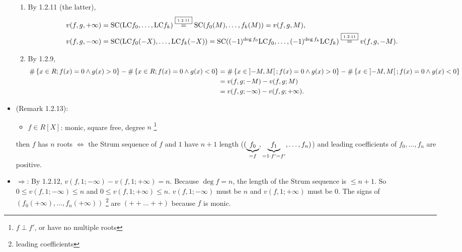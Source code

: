 \documentclass[9pt]{ltjsarticle}
\begin{document}
\begin{itemize}
\begin{enumerate}
    \item
    By 1.2.11 (the latter),
    \begin{align}
      v(f,g,+\infty) &= \mathrm{SC}({\rm LC} f_0,\dots,{\rm LC} f_k)
      \overset{\text{\fbox{\tiny 1.2.11}}}{=}
      \mathrm{SC}(f_0(M),\dots,f_k(M))
      =
      v(f,g,M),\\
      v(f,g,-\infty) &=
      \mathrm{SC}({\rm LC} f_0(-X),\dots,{\rm LC} f_k(-X))
      =
      \mathrm{SC}((-1)^{\deg f_0} {\rm LC} f_0,\dots, (-1)^{\deg f_k} {\rm LC} f_k)
      \overset{\text{\fbox{\tiny 1.2.11}}}{=}
      v(f,g,-M).
    \end{align}
    \item
    By 1.2.9,
    \begin{align}
      \# \left\{x\in R; f(x)=0 \land g(x)>0\right\} - \# \left\{x\in R; f(x)=0 \land g(x)<0\right\}
      &=
      \# \left\{x\in \left] -M,M \right[; f(x)=0 \land g(x)>0\right\} - \# \left\{x\in \left] -M,M \right[; f(x)=0 \land g(x)<0\right\}\\
      &=
      v(f,g;-M) - v(f,g;M)\\
      &=
      v(f,g;-\infty) - v(f,g;+\infty).
    \end{align}
  \end{enumerate}
  \item
  (Remark 1.2.13):
  \begin{itemize}
    \item $f\in R[X]$: monic, square free, degree $n$ \footnote{$f\perp f'$, or have no multiple roots}
  \end{itemize}
  then
  $f$ has $n$ roots $\iff$
  the Strum sequence of $f$ and $1$ have $n+1$ length ($(\underbrace{f_0}_{=f},\underbrace{f_1}_{=1\cdot f' = f'},\dots,f_n)$) and
  leading coefficients of $f_0,\dots,f_n$ are positive.
  \item
  \pf
  $\Rightarrow$:
  By 1.2.12, $v(f,1;-\infty)-v(f,1;+\infty)=n$.
  Because $\deg f = n$, the length of the Strum sequence is $\le n+1$.
  So $0\le v(f,1;-\infty)\le n$ and $0\le v(f,1;+\infty) \le n$.
  $v(f,1;-\infty)$ must be $n$ and $v(f,1;+\infty)$ must be $0$.
  The signs of $(f_0(+\infty),\dots,f_n(+\infty))$ \footnote{leading coefficients}
  are $(++\dots ++)$ because $f$ is monic.


\end{itemize}
\end{document}
